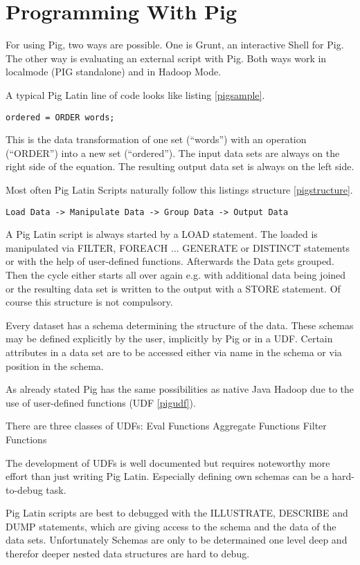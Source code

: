 \section{Programming With Pig}

For using Pig, two ways are possible. One is Grunt, an interactive Shell for Pig. The other way is evaluating an external script with Pig. Both ways work in localmode (PIG standalone) and in Hadoop Mode.
                              
A typical Pig Latin line of code looks like listing \ref{pigsample}.

\begin{lstlisting}[language=pig,caption=A typical Pig line of code,label=pigsample]
ordered = ORDER words;
\end{lstlisting}

This is the data transformation of one set (``words'') with an operation (``ORDER'') into a new set (``ordered''). The input data sets are always on the right side of the equation. The resulting output data set is always on the left side.

Most often Pig Latin Scripts naturally follow this listings structure \ref{pigstructure}.

\begin{lstlisting}[language=pig,caption=Pig Latin Script Structure ,label=pigstructure]
Load Data -> Manipulate Data -> Group Data -> Output Data
\end{lstlisting}
                                                       
A Pig Latin script is always started by a LOAD statement. The loaded is manipulated via FILTER, FOREACH ... GENERATE or DISTINCT statements or with the help of user-defined functions. Afterwards the Data gets grouped. Then the cycle either starts all over again e.g. with additional data being joined or the resulting data set is written to the output with a STORE statement. Of course this structure is not compulsory.
                   
Every dataset has a schema determining the structure of the data. These schemas may be defined explicitly by the user, implicitly by Pig or in a UDF. Certain attributes in a data set are to be accessed either via name in the schema or via position in the schema.

As already stated Pig has the same possibilities as native Java Hadoop due to the use of user-defined functions (UDF \ref{pigudf}).

There are three classes of UDFs:
 Eval Functions
 Aggregate Functions
 Filter Functions
 
The development of UDFs is well documented but requires noteworthy more effort than just writing Pig Latin. Especially defining own schemas can be a hard-to-debug task. 

Pig Latin scripts are best to debugged with the ILLUSTRATE, DESCRIBE and DUMP statements, which are giving access to the schema and the data of the data sets. Unfortunately Schemas are only to be determained one level deep and therefor deeper nested data structures are hard to debug.